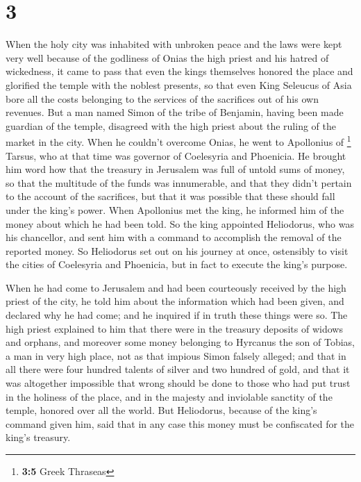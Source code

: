 \hypertarget{section-2}{%
\section{3}\label{section-2}}

 When the holy city was inhabited with unbroken peace and
the laws were kept very well because of the godliness of Onias the high
priest and his hatred of wickedness,  it came to pass that
even the kings themselves honored the place and glorified the temple
with the noblest presents,  so that even King Seleucus of
Asia bore all the costs belonging to the services of the sacrifices out
of his own revenues.  But a man named Simon of the tribe
of Benjamin, having been made guardian of the temple, disagreed with the
high priest about the ruling of the market in the city. 
When he couldn't overcome Onias, he went to Apollonius of \footnote{\textbf{3:5}
  Greek Thraseas} Tarsus, who at that time was governor of Coelesyria
and Phoenicia.  He brought him word how that the treasury
in Jerusalem was full of untold sums of money, so that the multitude of
the funds was innumerable, and that they didn't pertain to the account
of the sacrifices, but that it was possible that these should fall under
the king's power.  When Apollonius met the king, he
informed him of the money about which he had been told. So the king
appointed Heliodorus, who was his chancellor, and sent him with a
command to accomplish the removal of the reported money. 
So Heliodorus set out on his journey at once, ostensibly to visit the
cities of Coelesyria and Phoenicia, but in fact to execute the king's
purpose.

 When he had come to Jerusalem and had been courteously
received by the high priest of the city, he told him about the
information which had been given, and declared why he had come; and he
inquired if in truth these things were so.  The high
priest explained to him that there were in the treasury deposits of
widows and orphans,  and moreover some money belonging to
Hyrcanus the son of Tobias, a man in very high place, not as that
impious Simon falsely alleged; and that in all there were four hundred
talents of silver and two hundred of gold,  and that it
was altogether impossible that wrong should be done to those who had put
trust in the holiness of the place, and in the majesty and inviolable
sanctity of the temple, honored over all the world.  But
Heliodorus, because of the king's command given him, said that in any
case this money must be confiscated for the king's treasury.

